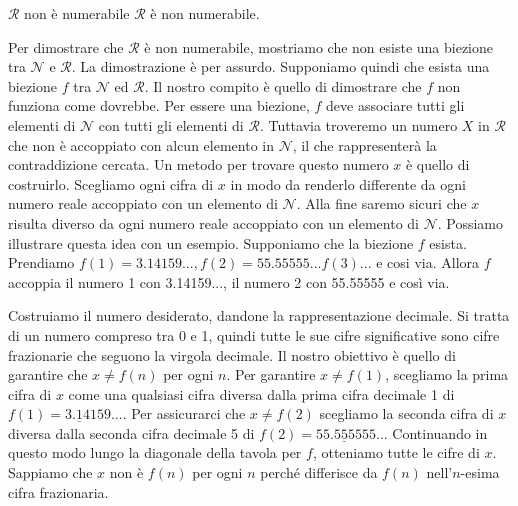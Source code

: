 \begin{Thm}{$\mathcal{R}$ non è numerabile}{}
$\mathcal{R}$ è non numerabile.

\begin{demonstration}
Per dimostrare che $\mathcal{R}$ è non numerabile, mostriamo che non esiste una biezione tra $\mathcal{N}$ e $\mathcal{R}$. La dimostrazione è per assurdo. Supponiamo quindi che esista una biezione $f$ tra $\mathcal{N}$ ed $\mathcal{R}$. Il nostro compito è quello di dimostrare che $f$ non funziona come dovrebbe. Per essere una biezione, $f$ deve associare tutti gli elementi di $\mathcal{N}$ con tutti gli elementi di $\mathcal{R}$. Tuttavia troveremo un numero $X$ in $\mathcal{R}$ che non è accoppiato con alcun elemento in $\mathcal{N}$, il che rappresenterà la contraddizione cercata. Un metodo per trovare questo numero $x$ è quello di costruirlo. Scegliamo ogni cifra di $x$ in modo da renderlo differente da ogni numero reale accoppiato con un elemento di $\mathcal{N}$. Alla fine saremo sicuri che $x$ risulta diverso da ogni numero reale accoppiato con un elemento di $\mathcal{N}$. Possiamo illustrare questa idea con un esempio. Supponiamo che la biezione $f$ esista. Prendiamo $f(1)=3.14159..., f(2)= 55.55555... f(3) ...$ e cosi via. Allora $f$ accoppia il numero 1 con 3.14159..., il numero 2 con 55.55555 e così via.

Costruiamo il numero desiderato, dandone la rappresentazione decimale. Si tratta di un numero compreso tra 0 e 1, quindi tutte le sue cifre significative sono cifre frazionarie che seguono la virgola decimale. Il nostro obiettivo è quello di garantire che $x\neq f(n)$ per ogni $n$. Per garantire $x\neq f(1)$, scegliamo la prima cifra di $x$ come una qualsiasi cifra diversa dalla prima cifra decimale 1 di $f(1) =3.\underline{1}4159...$. Per assicurarci che $x\neq f(2)$ scegliamo la seconda cifra di $x$ diversa dalla seconda cifra decimale 5 di $f(2) =55.5\underline{5}5555...$ Continuando in questo modo lungo la diagonale della tavola per $f$, otteniamo tutte le cifre di $x$. Sappiamo che $x$ non è $f(n)$ per ogni $n$ perché differisce da $f(n)$ nell'$n$-esima cifra frazionaria.
\end{demonstration}
\end{Thm}

